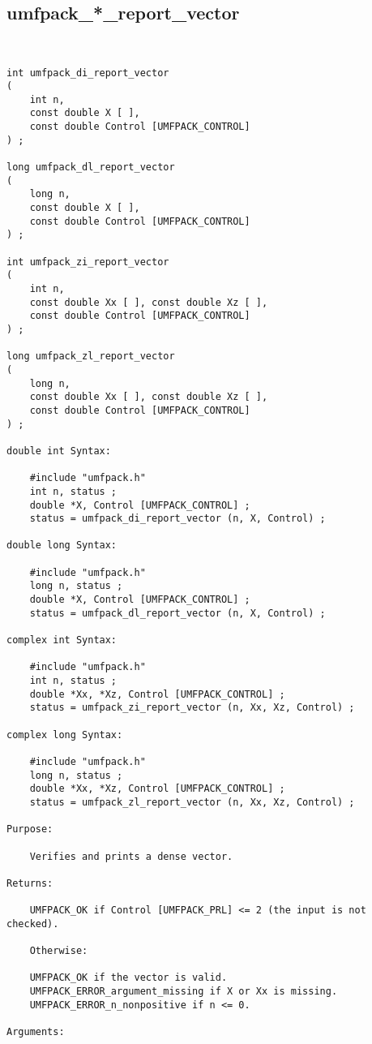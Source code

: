 \newpage
\subsection{umfpack\_*\_report\_vector}

{\footnotesize
\begin{verbatim}


int umfpack_di_report_vector
(
    int n,
    const double X [ ],
    const double Control [UMFPACK_CONTROL]
) ;

long umfpack_dl_report_vector
(
    long n,
    const double X [ ],
    const double Control [UMFPACK_CONTROL]
) ;

int umfpack_zi_report_vector
(
    int n,
    const double Xx [ ], const double Xz [ ],
    const double Control [UMFPACK_CONTROL]
) ;

long umfpack_zl_report_vector
(
    long n,
    const double Xx [ ], const double Xz [ ],
    const double Control [UMFPACK_CONTROL]
) ;

double int Syntax:

    #include "umfpack.h"
    int n, status ;
    double *X, Control [UMFPACK_CONTROL] ;
    status = umfpack_di_report_vector (n, X, Control) ;

double long Syntax:

    #include "umfpack.h"
    long n, status ;
    double *X, Control [UMFPACK_CONTROL] ;
    status = umfpack_dl_report_vector (n, X, Control) ;

complex int Syntax:

    #include "umfpack.h"
    int n, status ;
    double *Xx, *Xz, Control [UMFPACK_CONTROL] ;
    status = umfpack_zi_report_vector (n, Xx, Xz, Control) ;

complex long Syntax:

    #include "umfpack.h"
    long n, status ;
    double *Xx, *Xz, Control [UMFPACK_CONTROL] ;
    status = umfpack_zl_report_vector (n, Xx, Xz, Control) ;

Purpose:

    Verifies and prints a dense vector.

Returns:

    UMFPACK_OK if Control [UMFPACK_PRL] <= 2 (the input is not checked).

    Otherwise:
    
    UMFPACK_OK if the vector is valid.
    UMFPACK_ERROR_argument_missing if X or Xx is missing.
    UMFPACK_ERROR_n_nonpositive if n <= 0.

Arguments:


\end{verbatim}}
